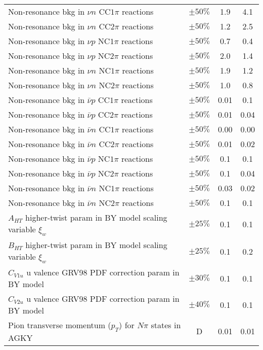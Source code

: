 \begin{doublespace}
\begin{longtable}{p{3.5in} c c c}
  Non-resonance bkg in $\nu n$ CC$1\pi$ reactions & $\pm50\%$ & 1.9 & 4.1 \\
  Non-resonance bkg in $\nu n$ CC$2\pi$ reactions & $\pm50\%$ & 1.2 & 2.5 \\
  Non-resonance bkg in $\nu p$ NC$1\pi$ reactions & $\pm50\%$ & 0.7 & 0.4 \\
  Non-resonance bkg in $\nu p$ NC$2\pi$ reactions & $\pm50\%$ & 2.0 & 1.4 \\
  Non-resonance bkg in $\nu n$ NC$1\pi$ reactions & $\pm50\%$ & 1.9 & 1.2 \\
  Non-resonance bkg in $\nu n$ NC$2\pi$ reactions & $\pm50\%$ & 1.0 & 0.8 \\
  Non-resonance bkg in $\bar{\nu} p$ CC$1\pi$ reactions & $\pm50\%$ & 0.01 & 0.1 \\
  Non-resonance bkg in $\bar{\nu} p$ CC$2\pi$ reactions & $\pm50\%$ & 0.01 & 0.04 \\
  Non-resonance bkg in $\bar{\nu} n$ CC$1\pi$ reactions & $\pm50\%$ & 0.00 & 0.00 \\
  Non-resonance bkg in $\bar{\nu} n$ CC$2\pi$ reactions & $\pm50\%$ & 0.01 & 0.02 \\
  Non-resonance bkg in $\bar{\nu} p$ NC$1\pi$ reactions & $\pm50\%$ & 0.1 & 0.1 \\
  Non-resonance bkg in $\bar{\nu} p$ NC$2\pi$ reactions & $\pm50\%$ & 0.1 & 0.04 \\
  Non-resonance bkg in $\bar{\nu} n$ NC$1\pi$ reactions & $\pm50\%$ & 0.03 & 0.02 \\
  Non-resonance bkg in $\bar{\nu} n$ NC$2\pi$ reactions & $\pm50\%$ & 0.1 & 0.1 \\
  $A_{HT}$ higher-twist param in BY model scaling \newline variable $\xi_w$ & $\pm25\%$ & 0.1 & 0.1 \\
  $B_{HT}$ higher-twist param in BY model scaling \newline variable $\xi_w$ & $\pm25\%$ & 0.1 & 0.2 \\
  $C_{V1u}$ u valence GRV98 PDF correction param in BY model & $\pm30\%$ & 0.1 & 0.1 \\
  $C_{V2u}$ u valence GRV98 PDF correction param in BY model & $\pm40\%$ & 0.1 & 0.1 \\
  Pion transverse momentum ($p_T$) for $N\pi$ states in AGKY & D & 0.01 & 0.01 \\

\end{longtable}
\end{doublespace}
